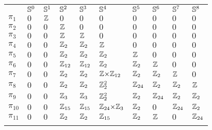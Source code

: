 \begin{table}[htb]
\centering\small
\begin{tabular}{p{15pt}>{\centering\arraybackslash}p{33pt}>{\centering\arraybackslash}p{33pt}>{\centering\arraybackslash}p{33pt}>{\centering\arraybackslash}p{33pt}>{\centering\arraybackslash}p{33pt}>{\centering\arraybackslash}p{33pt}>{\centering\arraybackslash}p{33pt}>{\centering\arraybackslash}p{33pt}>{\centering\arraybackslash}p{33pt}}
\toprule
           & $\mathbb{S}^0$ & $\mathbb{S}^1$ & $\mathbb{S}^{2}$ & $\mathbb{S}^{3}$ & $\mathbb{S}^{4}$ & $\mathbb{S}^{5}$ & $\mathbb{S}^{6}$ & $\mathbb{S}^{7}$ & $\mathbb{S}^{8}$ \\ \addlinespace[3pt] \midrule
$\pi_{1}$  & $0$     & $\mathbb{Z}$    & $0$       & $0$       & $0$       & $0$       & $0$       & $0$       & $0$       \\ \addlinespace[3pt]
$\pi_{2}$  & $0$     & $0$     & $\mathbb{Z}$      & $0$       & $0$       & $0$       & $0$       & $0$       & $0$       \\ \addlinespace[3pt]
$\pi_{3}$  & $0$     & $0$     & $\mathbb{Z}$      & $\mathbb{Z}$      & $0$       & $0$       & $0$       & $0$       & $0$       \\ \addlinespace[3pt]
$\pi_{4}$  & $0$     & $0$     & $\mathbb{Z}_{2}$  & $\mathbb{Z}_{2}$  & $\mathbb{Z}$      & $0$       & $0$       & $0$       & $0$       \\ \addlinespace[3pt]
$\pi_{5}$  & $0$     & $0$     & $\mathbb{Z}_{2}$  & $\mathbb{Z}_{2}$  & $\mathbb{Z}_{2}$  & $\mathbb{Z}$      & $0$       & $0$       & $0$       \\ \addlinespace[3pt]
$\pi_{6}$  & $0$     & $0$     & $\mathbb{Z}_{12}$ & $\mathbb{Z}_{12}$ & $\mathbb{Z}_{2}$  & $\mathbb{Z}_{2}$ & $\mathbb{Z}$       & $0$       & $0$       \\ \addlinespace[3pt]
$\pi_{7}$  & $0$     & $0$     & $\mathbb{Z}_{2}$  & $\mathbb{Z}_{2}$  & {\footnotesize $\mathbb{Z} {\times} \mathbb{Z}_{12}$} & $\mathbb{Z}_{2}$ & $\mathbb{Z}_{2}$ & $\mathbb{Z}$ & $0$ \\ \addlinespace[3pt]
$\pi_{8}$  & $0$     & $0$     & $\mathbb{Z}_{2}$  & $\mathbb{Z}_{2}$  & $\mathbb{Z}_{2}^{2}$ & $\mathbb{Z}_{24}$ & $\mathbb{Z}_{2}$ & $\mathbb{Z}_{2}$ & $\mathbb{Z}$ \\ \addlinespace[3pt]
$\pi_{9}$  & $0$     & $0$     & $\mathbb{Z}_{3}$  & $\mathbb{Z}_{3}$  & $\mathbb{Z}_{2}^{2}$ & $\mathbb{Z}_{2}$ & $\mathbb{Z}_{24}$ & $\mathbb{Z}_{2}$ & $\mathbb{Z}_{2}$ \\ \addlinespace[3pt]
$\pi_{10}$ & $0$     & $0$     & $\mathbb{Z}_{15}$ & $\mathbb{Z}_{15}$ & \footnotesize{$\mathbb{Z}_{24} {\times} \mathbb{Z}_{3}$} & $\mathbb{Z}_{2}$ & $0$ & $\mathbb{Z}_{24}$ & $\mathbb{Z}_{2}$ \\ \addlinespace[3pt]
$\pi_{11}$ & $0$     & $0$     & $\mathbb{Z}_{2}$  & $\mathbb{Z}_{2}$  & $\mathbb{Z}_{15}$ & $\mathbb{Z}_{2}$ & $\mathbb{Z}$ & $0$ & $\mathbb{Z}_{24}$ \\ \addlinespace[3pt]

\end{tabular}
\end{table}

